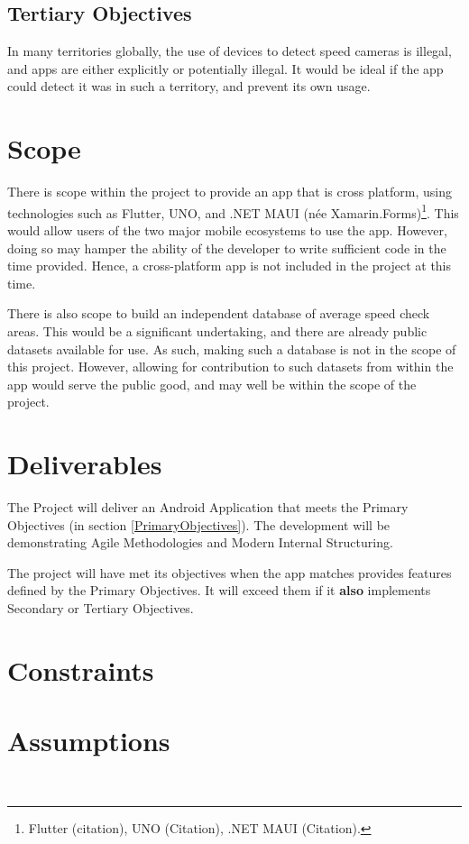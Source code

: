 \documentclass[11pt, a4paper, notitlepage]{report}
\begin{document}
\subsection{Tertiary Objectives}
In many territories globally, the use of devices to detect speed cameras is 
illegal, and apps are either explicitly or potentially illegal. It would be 
ideal if the app could detect it was in such a territory, and prevent its own 
usage.

\section{Scope}
There is scope within the project to provide an app that is cross 
platform, using technologies such as Flutter, UNO, and .NET MAUI (née 
Xamarin.Forms)\footnote{Flutter (citation), UNO (Citation), .NET MAUI (Citation).}. 
This would allow users of the two major mobile ecosystems to use the app. 
However, doing so may hamper the ability of the developer to write sufficient 
code in the time provided.
Hence, a cross-platform app is not included in the project at this time.

There is also scope to build an independent database of average speed check 
areas. 
This would be a significant undertaking, and there are already public datasets 
available for use. As such, making such a database is not 
in the scope of this project.
However, allowing for contribution to such datasets from within the app would 
serve the public good, and may well be within the scope of the project.

\section{Deliverables}
The Project will deliver an Android Application that meets the Primary 
Objectives (in section \ref{PrimaryObjectives}). The development will be 
demonstrating Agile Methodologies and Modern Internal Structuring.

The project will have met its objectives when the app matches provides 
features defined by the Primary Objectives. It will exceed them if it 
\textbf{also} implements Secondary or Tertiary Objectives.

\section{Constraints}

\section{Assumptions}
\
\end{document}
